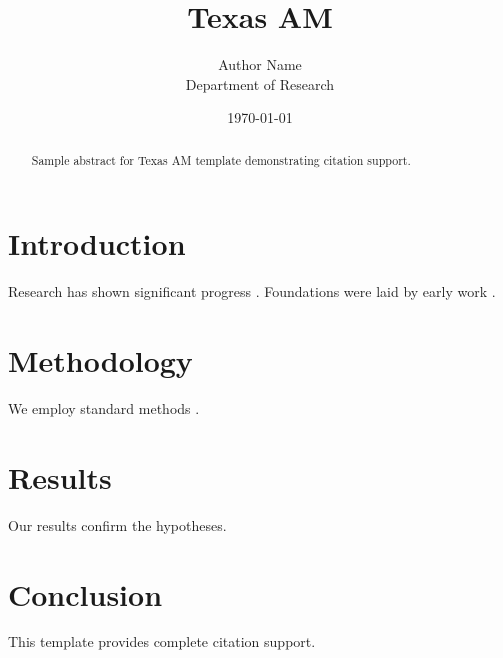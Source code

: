 \documentclass{thesis_tamu}
\title{Texas AM}
\author{Author Name \\ \small Department of Research}
\date{\today}
\begin{document}
\maketitle

\begin{abstract}
Sample abstract for Texas AM template demonstrating citation support.
\end{abstract}

\section{Introduction}
Research has shown significant progress \citep{einstein1905}. Foundations were laid by early work \citep{turing1950}.

\section{Methodology}
We employ standard methods \citep{knuth1984}.

\section{Results}
Our results confirm the hypotheses.

\section{Conclusion}
This template provides complete citation support.



\end{document}
